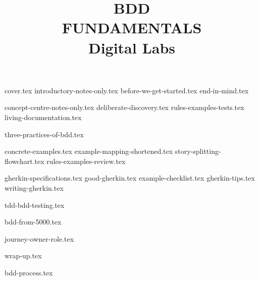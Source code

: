 \documentclass[a4paper,12pt]{report}
\title{BDD\\FUNDAMENTALS\\Digital Labs}
\begin{document}
{cover.tex}
{introductory-notes-only.tex}
{before-we-get-started.tex}
{end-in-mind.tex}

{concept-centre-notes-only.tex}
{deliberate-discovery.tex}
{rules-examples-tests.tex}
{living-documentation.tex}

{three-practices-of-bdd.tex}



{concrete-examples.tex}
{example-mapping-shortened.tex} 
{story-splitting-flowchart.tex}
{rules-examples-review.tex} 

{gherkin-specifications.tex}
{good-gherkin.tex}
{example-checklist.tex}
{gherkin-tips.tex}
{writing-gherkin.tex}

{tdd-bdd-testing.tex}

{bdd-from-5000.tex}

{journey-owner-role.tex}


{wrap-up.tex}

{bdd-process.tex}
\end{document}
